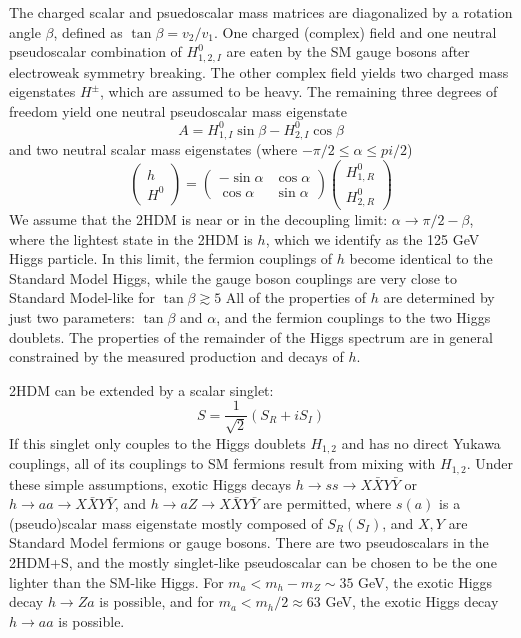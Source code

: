 \documentclass{article}
\begin{document}
The charged scalar and psuedoscalar mass matrices are diagonalized by a rotation angle $\beta$, defined as $\tan\beta = v_2/v_1$. One charged (complex) field and one neutral pseudoscalar combination of $H^0_{1, 2, I}$ are eaten by the SM gauge bosons after electroweak symmetry breaking. The other complex field yields two charged mass eigenstates $H^\pm$, which are assumed to be heavy. The remaining three degrees of freedom yield one neutral pseudoscalar mass eigenstate 
\begin{equation}
    A = H^0_{1, I}\sin\beta - H^0_{2, I} \cos\beta
\end{equation}
and two neutral scalar mass eigenstates (where $-\pi/2 \leq \alpha \leq pi/2$)
\begin{equation}
    \begin{pmatrix} h \\ H^0 \end{pmatrix} = \begin{pmatrix} -\sin\alpha & \cos\alpha \\
                                                              \cos\alpha & \sin\alpha \end{pmatrix}
                                             \begin{pmatrix} H^0_{1, R} \\ H^0_{2, R}  \end{pmatrix}
\end{equation}
We assume that the 2HDM is near or in the decoupling limit: $\alpha \rightarrow \pi/2 - \beta$, where the lightest state in the 2HDM is $h$, which we identify as the 125 GeV Higgs particle. In this limit, the fermion couplings of $h$ become identical to the Standard Model Higgs, while the gauge boson couplings are very close to Standard Model-like for $\tan\beta \gtrsim 5$ All of the properties of $h$ are determined by just two parameters: $\tan\beta$ and $\alpha$, and the fermion couplings to the two Higgs doublets. The properties of the remainder of the Higgs spectrum are in general constrained by the measured production and decays of $h$. 

2HDM can be extended by a scalar singlet:
\begin{equation}
    S = \frac{1}{\sqrt{2}} (S_R + iS_I)
\end{equation}
If this singlet only couples to the Higgs doublets $H_{1,2}$ and has no direct Yukawa couplings, all of its couplings to SM fermions result from mixing with $H_{1,2}$. Under these simple assumptions, exotic Higgs decays $h\rightarrow ss \rightarrow X\bar{X}Y\bar{Y}$ or $h\rightarrow aa \rightarrow X\bar{X}Y\bar{Y}$, and $h \rightarrow aZ \rightarrow X\bar{X}Y\bar{Y}$ are permitted, where $s(a)$ is a (pseudo)scalar mass eigenstate mostly composed of $S_R (S_I)$, and $X, Y$ are Standard Model fermions or gauge bosons. There are two pseudoscalars in the 2HDM+S, and the mostly singlet-like pseudoscalar can be chosen to be the one lighter than the SM-like Higgs. For $m_a < m_h - m_Z \sim 35$ GeV, the exotic Higgs decay $h \rightarrow Za$ is possible, and for $m_a < m_h/2 \approx 63$ GeV, the exotic Higgs decay $h \rightarrow aa$ is possible. 
\end{document}
